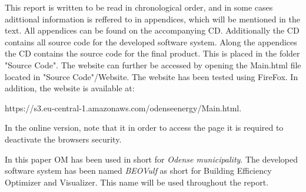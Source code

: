 This report is written to be read in chronological order, and in some cases adittional information is reffered to in appendices, which will be mentioned in the text. All appendices can be found on the accompanying CD. Additionally the CD contains all source code for the developed software system.
Along the appendices the CD contains the source code for the final product. This is placed in the folder "Source Code". The website can further be accessed by opening the Main.html file located in "Source Code"/Website. The website has been tested using FireFox. In addition, the website is available at:
\begin{center}
https://s3.eu-central-1.amazonaws.com/odenseenergy/Main.html.
\end{center}
In the online version, note that it in order to access the page it is required to deactivate the browsers security. 

In this paper OM has been used in short for \emph{Odense municipality}. The developed software system has been named \emph{BEOVulf} as short for Building Efficiency Optimizer and Visualizer. This name will be used throughout the report.
